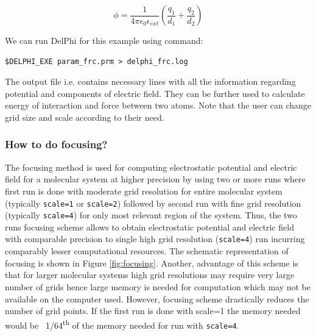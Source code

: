 \documentclass[9pt,tutorial]{livecoms}
\newcommand*\ttvar[1]{\texttt{\expandafter\dottvar\detokenize{#1}\relax}}
\newcommand*\dottvar[1]{\ifx\relax#1\else
  \expandafter\ifx\string_#1\string_\allowbreak\else#1\fi
  \expandafter\dottvar\fi}
\begin{document}
\begin{equation}\label{eqn:frc_at_point}
    \phi = \frac{1}{4\pi\epsilon_0\epsilon_{ext}} \left ( \frac{q_1}{d_1} + \frac{q_2}{d_2} \right)
\end{equation}

We can run DelPhi for this example using command:

\begin{verbatim}
$DELPHI_EXE param_frc.prm > delphi_frc.log
\end{verbatim}

The output \ttvar{frc} file i.e. \ttvar{atoms.frc} contains necessary lines with all the information regarding potential and components of electric field. They can be further used to calculate energy of interaction and force between two atoms. Note that the user can change grid size and scale according to their need.

\subsubsection{How to do focusing?}  The focusing method is used for computing electrostatic potential and electric field for a molecular system at higher precision by using two or more runs where first run is done with moderate grid resolution for entire molecular system (typically \texttt{scale=1} or \texttt{scale=2}) followed by second run with fine grid resolution (typically \texttt{scale=4}) for only most relevant region of the system.  Thus, the two runs focusing scheme allows to obtain electrostatic potential and electric field with comparable precision to single high grid resolution (\texttt{scale=4}) run incurring comparably lesser computational resources. The schematic representation of focusing is shown in Figure \ref{fig:focusing}. Another, advantage of this scheme is that for larger molecular systems high grid resolutions may require very large number of grids hence large memory is needed for computation which may not be available on the computer used. However, focusing scheme drastically reduces the number of grid points. If the first run is done with scale=1 the memory needed would be ~1/64\textsuperscript{th} of the memory needed for run with \texttt{scale=4}. 
\end{document}
